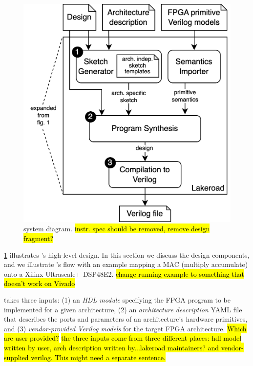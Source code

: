 \begin{figure}
    \centering
    \includegraphics[width=.8\columnwidth]{assets/lakeroad-diagram.drawio.png}
    \caption{\lr system diagram. \hl{instr. spec should be removed, remove design fragment?}}
    \label{fig:lakeroad-diagram}
\end{figure}
  
\cref{fig:lakeroad-diagram}
  illustrates \lr's high-level design.
In this section we discuss the design components,
  and we illustrate \lr's flow with
  an example mapping a MAC (multiply accumulate) onto
  a Xilinx Ultrascale+ DSP48E2.
\hl{change running example to something that doesn't work on Vivado}
  
\lr takes three inputs:
  (1) an \textit{HDL module} specifying
    the FPGA program 
    to be implemented
    for a given architecture,
  (2) an \textit{architecture description} YAML file
    that describes the ports and parameters
    of an architecture's 
    hardware primitives,
  and (3) \textit{vendor-provided Verilog models}
    for the target FPGA architecture.
\hl{Which are user provided?}
\hl{the three inputs come from three different places: hdl model written by user, arch description written by...lakeroad maintainers? and vendor-supplied verilog. This might need a separate sentence.}

